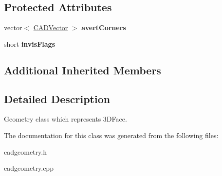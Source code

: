 \subsection*{Protected Attributes}
\begin{DoxyCompactItemize}
\item 
vector$<$ \hyperlink{class_c_a_d_vector}{C\+A\+D\+Vector} $>$ {\bfseries avert\+Corners}\hypertarget{class_c_a_d_face3_d_a4e72cf3fd2cfda9470bd1d67b6b5c8b9}{}\label{class_c_a_d_face3_d_a4e72cf3fd2cfda9470bd1d67b6b5c8b9}

\item 
short {\bfseries invis\+Flags}\hypertarget{class_c_a_d_face3_d_a64f7f3115db8442d07a5da218e693654}{}\label{class_c_a_d_face3_d_a64f7f3115db8442d07a5da218e693654}

\end{DoxyCompactItemize}
\subsection*{Additional Inherited Members}


\subsection{Detailed Description}
Geometry class which represents 3\+D\+Face. 

The documentation for this class was generated from the following files\+:\begin{DoxyCompactItemize}
\item 
cadgeometry.\+h\item 
cadgeometry.\+cpp\end{DoxyCompactItemize}
